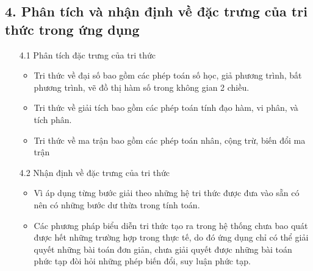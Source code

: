 \documentclass[a4paper]{article}
\begin{document}
 \subsection*{4. Phân tích và nhận định về đặc trưng của tri thức trong ứng dụng}

\begin{enumerate}
	
\item [4.1] Phân tích đặc trưng của tri thức
\begin{itemize}
\item Tri thức về đại số bao gồm các phép toán số học, giả phương trình, bất phương trình, vẽ đồ thị hàm số trong không gian 2 chiều.
\item Tri thức về giải tích bao gồm các phép toán tính đạo hàm, vi phân, và tích phân.
\item Tri thức về ma trận bao gồm các phép toán nhân, cộng trừ, biến đổi ma trận
\end{itemize}

\item [4.2]Nhận định về đặc trưng của tri thức
\begin{itemize}
\item Vì áp dụng từng bước giải theo những hệ tri thức được đưa vào sẵn có nên có những bước dư thừa trong tính toán.
\item Các phương pháp biểu diễn tri thức tạo ra trong hệ thống chưa bao quát được hết những trường hợp trong thực tế, do đó ứng dụng chỉ có thể giải quyết những bài toán đơn giản, chưa giải quyết được những bài toán phức tạp đòi hỏi những phép biến đổi, suy luận phức tạp.
\end{itemize}

\end{enumerate}	
\end{document}
